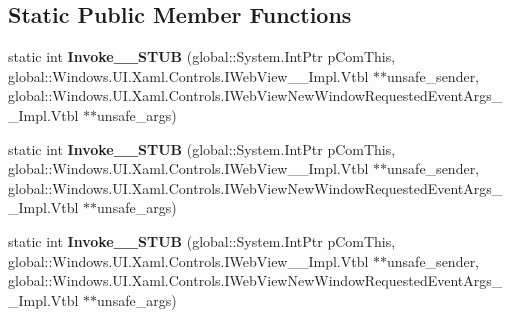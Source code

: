 \subsection*{Static Public Member Functions}
\begin{DoxyCompactItemize}
\item 
\mbox{\label{struct_windows_1_1_foundation_1_1_typed_event_handler___a___windows___u_i___xaml___controls___wec42a721acbd095ac78e4a49a8bbda864_a51e483ef980be894be0ddaab1cc3d22f}} 
static int {\bfseries Invoke\+\_\+\+\_\+\+S\+T\+UB} (global\+::\+System.\+Int\+Ptr p\+Com\+This, global\+::\+Windows.\+U\+I.\+Xaml.\+Controls.\+I\+Web\+View\+\_\+\+\_\+\+Impl.\+Vtbl $\ast$$\ast$unsafe\+\_\+sender, global\+::\+Windows.\+U\+I.\+Xaml.\+Controls.\+I\+Web\+View\+New\+Window\+Requested\+Event\+Args\+\_\+\+\_\+\+Impl.\+Vtbl $\ast$$\ast$unsafe\+\_\+args)
\item 
\mbox{\label{struct_windows_1_1_foundation_1_1_typed_event_handler___a___windows___u_i___xaml___controls___wec42a721acbd095ac78e4a49a8bbda864_a51e483ef980be894be0ddaab1cc3d22f}} 
static int {\bfseries Invoke\+\_\+\+\_\+\+S\+T\+UB} (global\+::\+System.\+Int\+Ptr p\+Com\+This, global\+::\+Windows.\+U\+I.\+Xaml.\+Controls.\+I\+Web\+View\+\_\+\+\_\+\+Impl.\+Vtbl $\ast$$\ast$unsafe\+\_\+sender, global\+::\+Windows.\+U\+I.\+Xaml.\+Controls.\+I\+Web\+View\+New\+Window\+Requested\+Event\+Args\+\_\+\+\_\+\+Impl.\+Vtbl $\ast$$\ast$unsafe\+\_\+args)
\item 
\mbox{\label{struct_windows_1_1_foundation_1_1_typed_event_handler___a___windows___u_i___xaml___controls___wec42a721acbd095ac78e4a49a8bbda864_a51e483ef980be894be0ddaab1cc3d22f}} 
static int {\bfseries Invoke\+\_\+\+\_\+\+S\+T\+UB} (global\+::\+System.\+Int\+Ptr p\+Com\+This, global\+::\+Windows.\+U\+I.\+Xaml.\+Controls.\+I\+Web\+View\+\_\+\+\_\+\+Impl.\+Vtbl $\ast$$\ast$unsafe\+\_\+sender, global\+::\+Windows.\+U\+I.\+Xaml.\+Controls.\+I\+Web\+View\+New\+Window\+Requested\+Event\+Args\+\_\+\+\_\+\+Impl.\+Vtbl $\ast$$\ast$unsafe\+\_\+args)
\item 

\end{DoxyCompactItemize}
